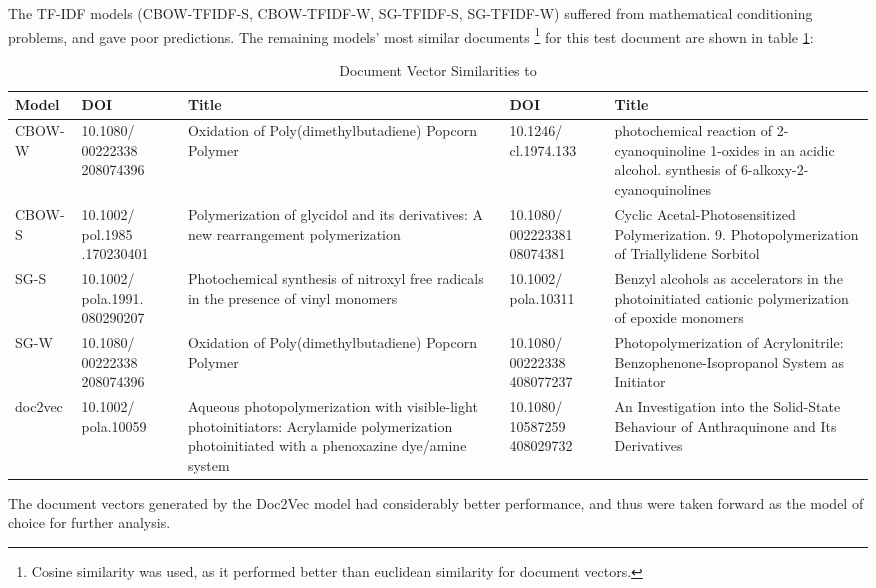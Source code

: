 The TF-IDF models (CBOW-TFIDF-S, CBOW-TFIDF-W, SG-TFIDF-S, SG-TFIDF-W) suffered from mathematical conditioning problems, and gave poor predictions. The remaining models' most similar documents \footnote{Cosine similarity was used, as it performed better than euclidean similarity for document vectors.} for this test document are shown in table \ref{tab:DOCSIMS}:
\begin{table}[H]
\centering
\caption[Examination of Document Vector similarities]{Document Vector Similarities to \cite {docassay}}
\label{tab:DOCSIMS}
\begin{tabular}{|l|p{2cm}|p{4cm}|p{2cm}|p{4cm}|}
\hline
Model           & DOI            & Title            & DOI              & Title              \\ \hline
CBOW-W               & 10.1080/ 00222338 208074396         & \footnotesize{Oxidation of Poly(dimethylbutadiene) Popcorn Polymer} &  10.1246/ cl.1974.133               &                   \footnotesize{photochemical reaction of 2-cyanoquinoline 1-oxides in an acidic alcohol. synthesis of 6-alkoxy-2-cyanoquinolines} \\ \hline
CBOW-S               & 10.1002/ pol.1985 .170230401          &  \footnotesize{Polymerization of glycidol and its derivatives: A new rearrangement polymerization}
                & 10.1080/ 002223381 08074381                & \footnotesize{Cyclic Acetal-Photosensitized Polymerization. 9. Photopolymerization of Triallylidene Sorbitol}
                   \\ \hline
SG-S                 & 10.1002/ pola.1991. 080290207            &   \footnotesize{Photochemical synthesis of nitroxyl free radicals in the presence of vinyl monomers}
               &  10.1002/ pola.10311              &  \footnotesize{Benzyl alcohols as accelerators in the photoinitiated cationic polymerization of epoxide monomers}
                  \\ \hline
SG-W                 & 10.1080/ 00222338 208074396            &    \footnotesize{Oxidation of Poly(dimethylbutadiene) Popcorn Polymer}
              & 10.1080/ 00222338 408077237                &  \footnotesize{Photopolymerization of Acrylonitrile: Benzophenone-Isopropanol System as Initiator}
                 \\ \hline
doc2vec                    &  10.1002/ pola.10059              &  \footnotesize{Aqueous photopolymerization with visible-light photoinitiators: Acrylamide polymerization photoinitiated with a phenoxazine dye/amine system}
                & 10.1080/ 10587259 408029732                 & \footnotesize{ An Investigation into the Solid-State Behaviour of Anthraquinone and Its Derivatives}
                 \\ \hline
\end{tabular}
\end{table}
The document vectors generated by the Doc2Vec model had considerably better performance, and thus were taken forward as the model of choice for further analysis.  
